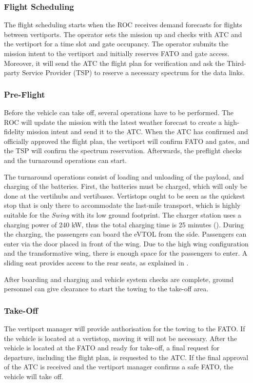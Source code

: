 \subsubsection{Flight Scheduling}
The flight scheduling starts when the ROC receives demand forecasts for flights between vertiports.
The operator sets the mission up and checks with ATC and the vertiport for a time slot and gate occupancy.
The operator submits the mission intent to the vertiport and initially reserves FATO and gate access.
Moreover, it will send the ATC the flight plan for verification and ask the Third-party Service Provider (TSP) to reserve a necessary spectrum for the data links.

\subsubsection{Pre-Flight}
Before the vehicle can take off, several operations have to be performed.
The ROC will update the mission with the latest weather forecast to create a high-fidelity mission intent and send it to the ATC. When the ATC has confirmed and officially approved the flight plan, the vertiport will confirm FATO and gates, and the TSP will confirm the spectrum reservation.
Afterwards, the preflight checks and the turnaround operations can start.

The turnaround operations consist of loading and unloading of the payload, and charging of the batteries.
First, the batteries must be charged, which will only be done at the vertihubs and vertibases.
Vertistops ought to be seen as the quickest stop that is only there to accommodate the last-mile transport, which is highly suitable for the \textit{Swing} with its low ground footprint.
The charger station uses a charging power of 240 kW, thus the total charging time is 25 minutes (). During the charging, the passengers can board the eVTOL from the side.
Passengers can enter via the door placed in front of the wing.
Due to the high wing configuration and the transformative wing, there is enough space for the passengers to enter.
A sliding seat provides access to the rear seats, as explained in .

After boarding and charging and vehicle system checks are complete, ground personnel can give clearance to start the towing to the take-off area. 
\subsubsection{Take-Off}
The vertiport manager will provide authorisation for the towing to the FATO. If the vehicle is located at a vertistop, moving it will not be necessary.
After the vehicle is located at the FATO and ready for take-off, a final request for departure, including the flight plan, is requested to the ATC. If the final approval of the ATC is received and the vertiport manager confirms a safe FATO, the vehicle will take off.

